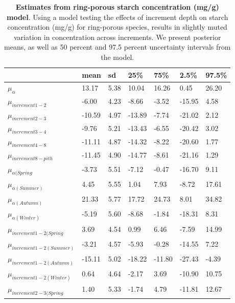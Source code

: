 \documentclass{article}\usepackage[]{graphicx}\usepackage[]{color}
\begin{document}
\begin{table}[ht]
\centering
\caption{\textbf{Estimates from ring-porous starch concentration (mg/g) model}. Using a model testing the effects of increment depth on starch concentration (mg/g) for ring-porous species, results in slightly muted variation in concentration across increments. We present posterior means, as well as 50 percent and 97.5 percent uncertainty intervals from the model.} 
\label{tab:ringstar}
\begingroup\footnotesize
\begin{tabular}{|p{}|p{}|p{}|p{}|p{}|p{}|p{}|}
  \hline
 & mean & sd & 25\% & 75\% & 2.5\% & 97.5\% \\ 
  \hline
$\mu_{\alpha}$ & 13.17 & 5.38 & 10.04 & 16.26 & 0.45 & 26.20 \\ 
  $\mu_{increment 1-2}$ & -6.00 & 4.23 & -8.66 & -3.52 & -15.95 & 4.58 \\ 
  $\mu_{increment 2-3}$ & -10.59 & 4.97 & -13.89 & -7.74 & -21.02 & 2.12 \\ 
  $\mu_{increment 3-4}$ & -9.76 & 5.21 & -13.43 & -6.55 & -20.42 & 3.02 \\ 
  $\mu_{increment 4-8}$ & -11.11 & 4.87 & -14.32 & -8.22 & -20.60 & 1.77 \\ 
  $\mu_{increment 8-pith}$ & -11.45 & 4.90 & -14.77 & -8.61 & -21.16 & 1.29 \\ 
  $\mu_{\alpha (Spring}$ & -3.73 & 5.51 & -7.12 & -0.47 & -16.70 & 9.11 \\ 
  $\mu_{\alpha (Summer)}$ & 4.45 & 5.55 & 1.04 & 7.93 & -8.72 & 17.61 \\ 
  $\mu_{\alpha (Autumn)}$ & 21.33 & 5.77 & 17.72 & 24.73 & 8.01 & 34.82 \\ 
  $\mu_{\alpha (Winter)}$ & -5.19 & 5.60 & -8.68 & -1.84 & -18.31 & 8.31 \\ 
  $\mu_{increment 1-2 (Spring}$ & 3.69 & 4.54 & 0.99 & 6.46 & -7.59 & 14.99 \\ 
  $\mu_{increment 1-2 (Summer)}$ & -3.21 & 4.57 & -5.93 & -0.28 & -14.55 & 7.22 \\ 
  $\mu_{increment 1-2 (Autumn)}$ & -15.11 & 5.02 & -18.22 & -11.80 & -27.43 & -4.39 \\ 
  $\mu_{increment 1-2 (Winter)}$ & 0.64 & 4.64 & -2.17 & 3.69 & -10.90 & 10.75 \\ 
  $\mu_{increment 2-3 (Spring}$ & 1.40 & 5.33 & -1.74 & 4.79 & -11.81 & 12.67 \\ 

\end{tabular}
\end{table}
\end{document}

